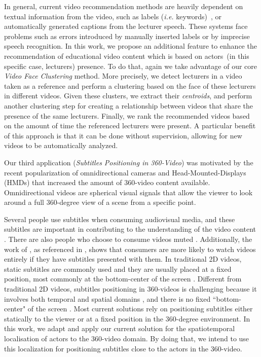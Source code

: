 In general, current video recommendation methods are heavily dependent on textual information from the video, such as labels (\textit{i.e.} keywords)~\cite{mahajan2015optimising,omisore2014personalized}, or automatically generated captions \cite{barrere2020utilizaccao} from the lecturer speech. These systems face problems such as errors introduced by manually inserted labels or by imprecise speech recognition.
In this work, we propose an additional feature to enhance the recommendation of educational video content which is based on actors~(in this specific case, lecturers) presence. To do that, again we take advantage of our core \emph{Video Face Clustering} method. More precisely, we detect lecturers in a video taken as a reference and perform a clustering based on the face of these lecturers in different videos. Given these clusters, we extract their \textit{centroids}, and perform another clustering step for creating a relationship between videos that share the presence of the same lecturers. Finally, we rank the recommended videos based on the amount of time the referenced lecturers were present.
A particular benefit of this approach is that it can be done without supervision, allowing for new videos to be automatically analyzed.

Our third application (\emph{Subtitles Positioning in 360-Video}) was motivated by the recent popularization of omnidirectional cameras and Head-Mounted-Displays (HMDs) that increased the amount of 360-video content available. Omnidirectional videos are spherical visual signals that allow the viewer to look around a full 360-degree view of a scene from a specific point.

Several people use subtitles when consuming audiovisual media, and these subtitles are important in contributing to the understanding of the video content \cite{brown_subtitles_2017}. There are also people who choose to consume videos muted \cite{hughes_disruptive_2019}. Additionally, the work of \cite{hayati2011effect}, as referenced in \cite{hughes_disruptive_2019}, shows that consumers are more likely to watch videos entirely if they have subtitles presented with them. In traditional 2D videos, static subtitles are commonly used and they are usually placed at a fixed position, most commonly at the bottom-center of the screen \cite{rothe_dynamic_2018}.
Different from traditional 2D videos, subtitles positioning in 360-videos is challenging because it involves both temporal and spatial domains \cite{agullo2019making}, and there is no fixed ``bottom-center" of the screen \cite{brown_subtitles_2017}. Most current solutions rely on positioning subtitles either statically to the viewer or at a fixed position in the 360-degree environment. %
In this work, we adapt and apply our current solution for the spatiotemporal localisation of actors to the 360-video domain. By doing that, we intend to use this localization for positioning subtitles close to the actors in the 360-video.

